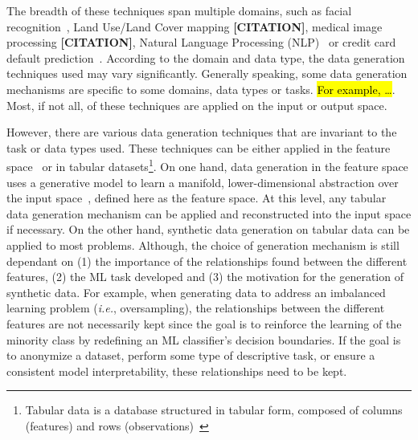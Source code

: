 \documentclass[parskip=full]{scrartcl}
\begin{document}
%
%
%
%

The breadth of these techniques span multiple domains, such as facial
recognition~\cite{lv2017data}, Land Use/Land Cover mapping
\textbf{[CITATION]}, medical image processing \textbf{[CITATION]}, Natural
Language Processing (NLP)~\cite{feng2021survey} or credit card default
prediction~\cite{alam2020investigation}. According to the domain and data
type, the data generation techniques used may vary significantly. Generally
speaking, some data generation mechanisms are specific to some domains, data
types or tasks. \hl{For example, \ldots}. Most, if not all, of these
techniques are applied on the input or output space.

However, there are various data generation techniques that are invariant to
the task or data types used. These techniques can be either applied in the
feature space~\cite{devries2017dataset} or in tabular
datasets\footnote{Tabular data is a database structured in tabular form,
composed of columns (features) and rows (observations)~\cite{yoon2020vime}}.
On one hand, data generation in the feature space uses a generative model to
learn a manifold, lower-dimensional abstraction over the input
space~\cite{kingma2019introduction}, defined here as the feature space. At
this level, any tabular data generation mechanism can be applied and
reconstructed into the input space if necessary. On the other hand, synthetic
data generation on tabular data can be applied to most problems. Although, the
choice of generation mechanism is still dependant on (1) the importance of the
relationships found between the different features, (2) the ML task developed
and (3) the motivation for the generation of synthetic data. For example, when
generating data to address an imbalanced learning problem (\textit{i.e.},
oversampling), the relationships between the different features are not
necessarily kept since the goal is to reinforce the learning of the minority
class by redefining an ML classifier's decision boundaries. If the goal is to
anonymize a dataset, perform some type of descriptive task, or ensure a
consistent model interpretability, these relationships need to be kept.
\end{document}
